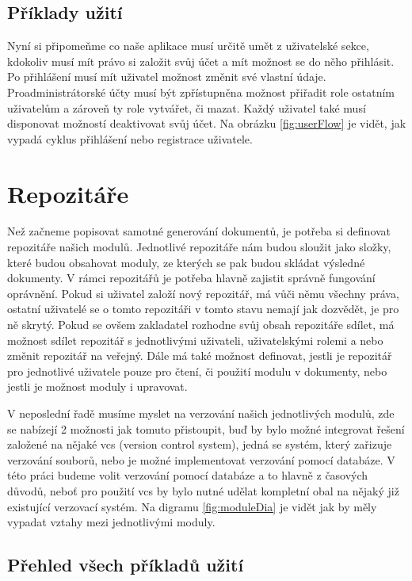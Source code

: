 \subsection{Příklady užití}

Nyní si připomeňme co naše aplikace musí určitě umět z uživatelské sekce, kdokoliv musí mít právo si založit svůj účet a mít možnost se do něho přihlásit.
Po přihlášení musí mít uživatel možnost změnit své vlastní údaje. Pro\linebreak \mbox{administrátorské} účty musí být zpřístupněna možnost přiřadit role ostatním uživatelům
a zároveň ty role vytvářet, či mazat. Každý uživatel také musí disponovat možností deaktivovat svůj účet. Na obrázku \ref{fig:userFlow} je vidět, jak \mbox{vypadá}
cyklus přihlášení nebo registrace uživatele.

\section{Repozitáře}

Než začneme popisovat samotné generování dokumentů, je potřeba si \mbox{definovat} repozitáře našich modulů. Jednotlivé repozitáře nám budou sloužit jako složky,
které budou obsahovat moduly, ze kterých se pak budou skládat výsledné dokumenty. V rámci repozitářů je potřeba hlavně zajistit správně fungování oprávnění.
Pokud si uživatel založí nový repozitář, má vůči němu všechny práva, ostatní uživatelé se o tomto repozitáři v tomto stavu nemají jak dozvědět, je pro ně
skrytý. Pokud se ovšem zakladatel rozhodne svůj obsah repozitáře sdílet, má možnost sdílet repozitář s jednotlivými uživateli, uživatelskými rolemi a nebo
změnit repozitář na veřejný. Dále má také možnost definovat, jestli je repozitář pro jednotlivé uživatele pouze pro čtení, či použití modulu v dokumenty,
nebo jestli je možnost moduly i upravovat.

V neposlední řadě musíme myslet na verzování našich jednotlivých modulů, zde se nabízejí 2 možnosti jak tomuto přistoupit, buď by bylo možné integrovat
řešení založené na nějaké vcs (version control system), jedná se systém, který zařizuje verzování souborů,
nebo je možné implementovat verzování pomocí databáze. V této práci budeme volit verzování pomocí databáze a to hlavně z časových důvodů, neboť
pro použití vcs by bylo nutné udělat kompletní obal na nějaký již existující verzovací systém. Na digramu \ref{fig:moduleDia} je vidět jak by měly
vypadat vztahy mezi jednotlivými moduly.

\subsection{Přehled všech příkladů užití}

